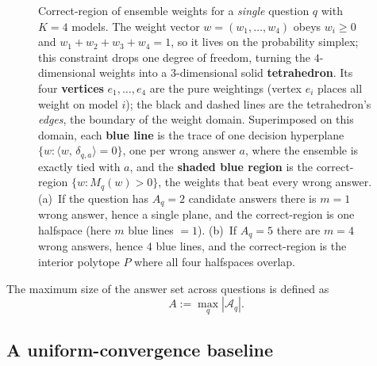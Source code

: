 \documentclass{article} %
\providecommand{\Aq}{\mathcal{A}_q}
\providecommand{\ip}[2]{\langle #1,\, #2\rangle}
\begin{document}
\begin{figure}[t]
\caption{Correct-region of ensemble weights for a \emph{single} question $q$ with
$K=4$ models. The weight vector $w=(w_1,\dots,w_4)$ obeys $w_i\ge 0$ and
$w_1+w_2+w_3+w_4=1$, so it lives on the probability simplex; this constraint drops
one degree of freedom, turning the $4$-dimensional weights into a $3$-dimensional
solid \textbf{tetrahedron}. Its four \textbf{vertices} $e_1,\dots,e_4$ are the
pure weightings (vertex $e_i$ places all weight on model $i$); the black and
dashed lines are the tetrahedron's \emph{edges}, the boundary of the weight
domain.
Superimposed on this domain, each \textbf{blue line} is the trace of one decision
hyperplane $\{w:\ip{w}{\delta_{q,a}}=0\}$, one per wrong answer $a$, where the
ensemble is exactly tied with $a$, and the \textbf{shaded blue region} is the
correct-region $\{w:M_q(w)>0\}$, the weights that beat every wrong answer.
(a)~If the question has $A_q=2$ candidate answers there is $m=1$ wrong answer,
hence a single plane, and the correct-region is one halfspace (here $m$ blue
lines $=1$). (b)~If $A_q=5$ there are $m=4$ wrong answers, hence $4$ blue lines,
and the correct-region is the interior polytope $P$ where all four halfspaces
overlap.}
\label{fig:simplex}
\end{figure}
The maximum size of the answer set across questions is defined as
\begin{equation}
\label{eq:A}
A := \max_q |\Aq|.
\end{equation}

\subsection{A uniform-convergence baseline}
\label{sec:method-vc}
\end{document}
